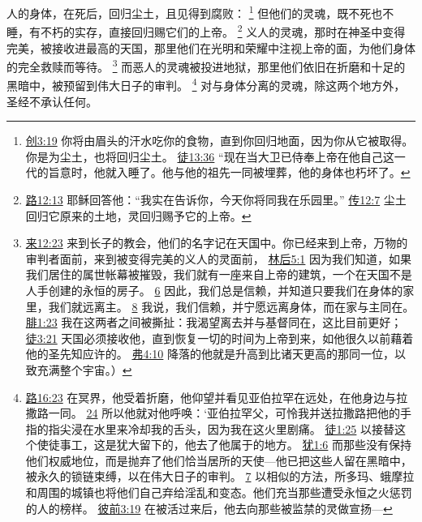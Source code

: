\documentclass[12pt, a4paper, oneside]{ctexart}
\newcounter{parnum}[section]
\newcommand{\N}{%
   \noindent\refstepcounter{parnum}%
    \makebox[\parindent][l]{\textbf{\arabic{parnum}.}}}
\begin{document}
\N 人的身体，在死后，回归尘土，且见得到腐败：
	\footnote {
		\href{https://biblehub.com/genesis/3-19.htm}{创3:19} 你将由眉头的汗水吃你的食物，直到你回归地面，因为你从它被取得。你是为尘土，也将回归尘土。
		\href{https://biblehub.com/acts/13-36.htm}{徒13:36} “现在当大卫已侍奉上帝在他自己这一代的旨意时，他就入睡了。他与他的祖先一同被埋葬，他的身体也朽坏了。
	}
	但他们的灵魂，既不死也不睡，有不朽的实存，直接回归赐它们的上帝。
	\footnote {
		\href{https://biblehub.com/luke/23-43.htm}{路12:13} 耶稣回答他：“我实在告诉你，今天你将同我在乐园里。”
		\href{https://biblehub.com/ecclesiastes/12-7.htm}{传12:7} 尘土回归它原来的土地，灵回归赐予它的上帝。
	}
	义人的灵魂，那时在神圣中变得完美，被接收进最高的天国，那里他们在光明和荣耀中注视上帝的面，为他们身体的完全救赎而等待。
	\footnote {
		\href{https://biblehub.com/hebrews/12-23.htm}{来12:23} 来到长子的教会，他们的名字记在天国中。你已经来到上帝，万物的审判者面前，来到被变得完美的义人的灵面前，
		\href{https://biblehub.com/2_corinthians/5-1.htm}{林后5:1} 因为我们知道，如果我们居住的属世帐幕被摧毁，我们就有一座来自上帝的建筑，一个在天国不是人手创建的永恒的房子。
		\href{https://biblehub.com/2_corinthians/5-6.htm}{6} 因此，我们总是信赖，并知道只要我们在身体的家里，我们就远离主。
		\href{https://biblehub.com/2_corinthians/5-8.htm}{8} 我说，我们信赖，并宁愿远离身体，而在家与主同在。
		\href{https://biblehub.com/philippians/1-23.htm}{腓1:23} 我在这两者之间被撕扯：我渴望离去并与基督同在，这比目前更好；
		\href{https://biblehub.com/acts/3-21.htm}{徒3:21} 天国必须接收他，直到恢复一切的时间为上帝到来，如他很久以前藉着他的圣先知应许的。
		\href{https://biblehub.com/ephesians/4-10.htm}{弗4:10} 降落的他就是升高到比诸天更高的那同一位，以致充满整个宇宙。）
	}
	而恶人的灵魂被投进地狱，那里他们依旧在折磨和十足的黑暗中，被预留到伟大日子的审判。
	\footnote {
		\href{https://biblehub.com/luke/16-23.htm}{路16:23} 在冥界，他受着折磨，他仰望并看见亚伯拉罕在远处，在他身边与拉撒路一同。
		\href{https://biblehub.com/luke/16-24.htm}{24} 所以他就对他呼唤：‘亚伯拉罕父，可怜我并送拉撒路把他的手指的指尖浸在水里来冷却我的舌头，因为我在这火里剧痛。
		\href{https://biblehub.com/acts/1-25.htm}{徒1:25} 以接替这个使徒事工，这是犹大留下的，他去了他属于的地方。
		\href{https://biblehub.com/jude/1-6.htm}{犹1:6} 而那些没有保持他们权威地位，而是抛弃了他们恰当居所的天使---他已把这些人留在黑暗中，被永久的锁链束缚，以在伟大日子的审判。
		\href{https://biblehub.com/jude/1-7.htm}{7} 以相似的方法，所多玛、蛾摩拉和周围的城镇也将他们自己弃给淫乱和变态。他们充当那些遭受永恒之火惩罚的人的榜样。
		\href{https://biblehub.com/1_peter/3-19.htm}{彼前3:19} 在被活过来后，他去向那些被监禁的灵做宣扬---
	}
	对与身体分离的灵魂，除这两个地方外，圣经不承认任何。
	
\end{document}
